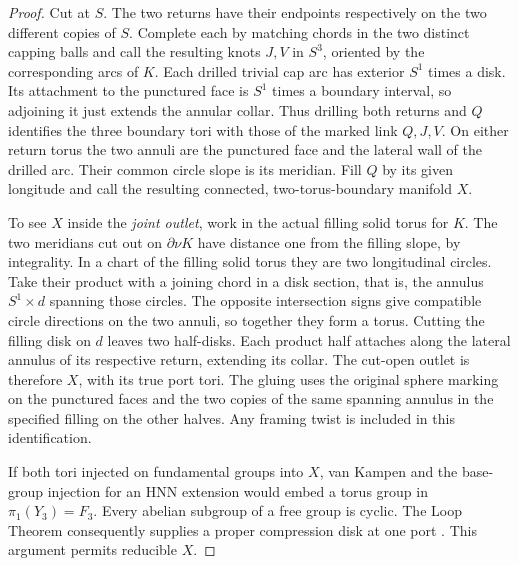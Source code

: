 \documentclass[11pt,letterpaper]{article}
\numberwithin{equation}{section}
\theoremstyle{remark}
\begin{document}
\begin{proof}
Cut at \(S\). The two returns have their endpoints respectively on
the two different copies of \(S\). Complete each by matching chords
in the two distinct capping balls and call the resulting knots \(J,V\)
in \(S^3\), oriented by the corresponding arcs of \(K\). Each drilled
trivial cap arc has exterior \(S^1\) times a disk. Its attachment to
the punctured face is \(S^1\) times a boundary interval, so adjoining
it just extends the annular collar. Thus drilling both returns and
\(Q\) identifies the three boundary tori with those of the marked
link \(Q,J,V\). On either return torus the two annuli are the punctured
face and the lateral wall of the drilled arc. Their common circle
slope is its meridian. Fill \(Q\) by its given longitude and call
the resulting connected, two-torus-boundary manifold \(X\).

To see \(X\) inside the \emph{joint outlet}, work in the actual
filling solid torus for \(K\). The two meridians cut out on
\(\partial\nu K\) have distance one from the filling slope, by
integrality. In a chart of the filling solid torus they are two
longitudinal circles. Take their product with a joining chord in a
disk section, that is, the annulus \(S^1\times d\) spanning those
circles. The opposite intersection signs give compatible circle
directions on the two annuli, so together they form a torus. Cutting the filling disk on \(d\) leaves two half-disks.
Each product half attaches along the lateral annulus of its respective
return, extending its collar. The cut-open outlet is therefore \(X\),
with its true port tori. The gluing uses the original sphere marking
on the punctured faces and the two copies of the same spanning annulus
in the specified filling on the other halves. Any framing twist is
included in this identification.

If both tori injected on fundamental groups into \(X\), van Kampen
and the base-group injection for an HNN extension
\cite[Theorem~I]{HigmanNeumannNeumann1949} would embed a torus group in
\(\pi_1(Y_3)=F_3\). Every abelian subgroup of a free group is cyclic.
The Loop Theorem consequently supplies a proper compression disk at
one port \cite{Stallings1960Loop}. This argument permits reducible
\(X\).


\end{proof}
\end{document}

